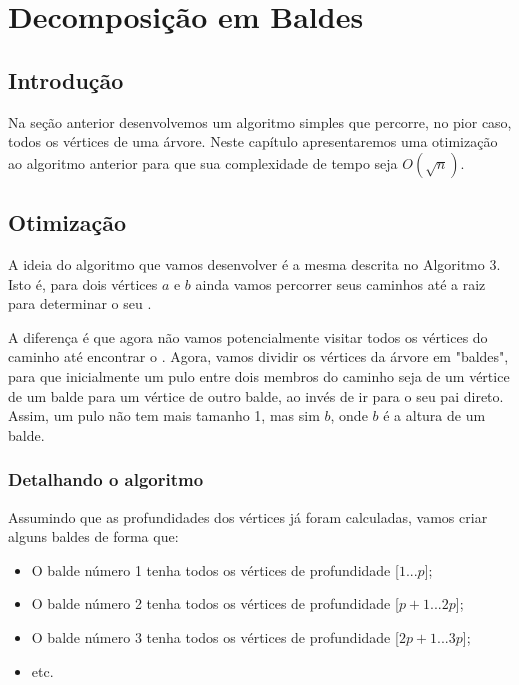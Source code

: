 \chapter{Decomposição em Baldes}
\label{cap:decomp-raiz}

\section{Introdução}

Na seção anterior desenvolvemos um algoritmo simples que percorre, no pior caso, todos os vértices de uma árvore. Neste capítulo apresentaremos uma otimização ao algoritmo anterior para que sua complexidade de tempo seja $O(\sqrt{n})$.

\section{Otimização}

A ideia do algoritmo que vamos desenvolver é a mesma descrita no Algoritmo 3. Isto é, para dois vértices $a$ e $b$ ainda vamos percorrer seus caminhos até a raiz para determinar o seu \LCA.

A diferença é que agora não vamos potencialmente visitar todos os vértices do caminho até encontrar o \LCA. Agora, vamos dividir os vértices da árvore em "baldes", para que inicialmente um pulo entre dois membros do caminho seja de um vértice de um balde para um vértice de outro balde, ao invés de ir para o seu pai direto. Assim, um pulo não tem mais tamanho 1, mas sim $b$, onde $b$ é a altura de um balde.

\subsection{Detalhando o algoritmo}

Assumindo que as profundidades dos vértices já foram calculadas, vamos criar alguns baldes de forma que:

\begin{itemize}
    \item O balde número 1 tenha todos os vértices de profundidade [$1$...$p$];
    \item O balde número 2 tenha todos os vértices de profundidade [$p+1$...$2p$];
    \item O balde número 3 tenha todos os vértices de profundidade [$2p+1$...$3p$];
    \item etc.
\end{itemize}

